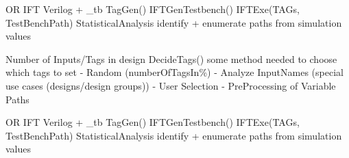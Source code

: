 \documentclass{article}
\begin{document}
\begin{algorithm}
    \caption{IFTPA (IFT Path Analysis)}
    \begin{algorithmic}[1]
        \Require OR IFT Verilog + \_tb
        \State TagGen() 
            \State IFTGenTestbench() 
            \State IFTExe(TAGs, TestBenchPath)
            \State StatisticalAnalysis \Comment identify + enumerate paths from simulation values
        \EndFor 
    \end{algorithmic}
\end{algorithm}

\begin{algorithm}
    \caption{TagGen (Tag Generation method)}
    \begin{algorithmic}[1]
        \Require Number of Inputs/Tags in design
        \State DecideTags() \Comment some method needed to choose which tags to set
            \State - Random (numberOfTagsIn\%) 
            \State - Analyze InputNames (special use cases (designs/design groups)) 
            \State - User Selection
            \State - PreProcessing of Variable Paths 
    \end{algorithmic}
\end{algorithm}
\begin{algorithm}
    \caption{IFTPA (IFT Path Analysis)}
    \begin{algorithmic}[1]
        \Require OR IFT Verilog + \_tb
        \State TagGen() 
            \State IFTGenTestbench() 
            \State IFTExe(TAGs, TestBenchPath)
            \State StatisticalAnalysis \Comment identify + enumerate paths from simulation values
        \EndFor 
    \end{algorithmic}
\end{algorithm}
\end{document}
